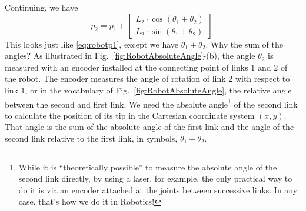 Continuing, we have 
$$p_2 = p_1 + \left[\begin{array}{c} L_2 \cdot \cos(\theta_1 + \theta_2) \\ L_2 \cdot \sin(\theta_1 +  \theta_2)\end{array}\right].$$
This looks just like \eqref{eq:robotp1}, except we have $\theta_1 + \theta_2$. Why the sum of the angles? As illustrated in Fig.~\ref{fig:RobotAbsoluteAngle}-(b), the angle $\theta_2$ is measured with an encoder installed at the connecting point of links 1 and 2 of the robot. The encoder measures the angle of rotation of link 2 with respect to link 1, or in the vocabulary of Fig.~\ref{fig:RobotAbsoluteAngle}, the relative angle between the second and first link. We need the absolute angle\footnote{While it is ``theoretically possible'' to measure the absolute angle of the second link directly, by using a laser, for example, the only practical way to do it is via an encoder attached at the joints between successive links. In any case, that's how we do it in Robotics!} of the second link to calculate the position of its tip in the Cartesian coordinate system $(x, y)$. That angle is the sum of the absolute angle of the first link and the angle of the second link relative to the first link, in symbols, $\theta_1 + \theta_2$.  


